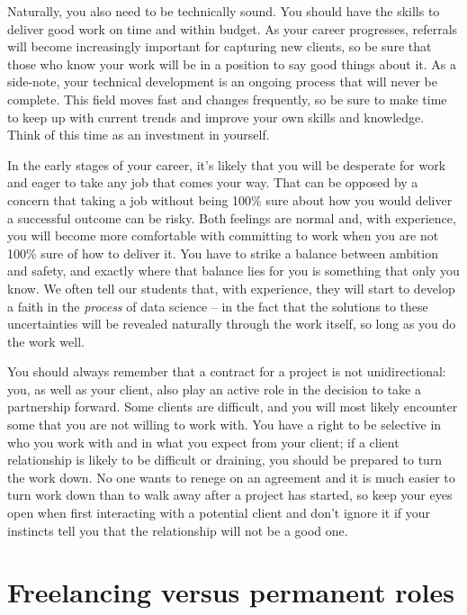 \documentclass[
]{book}
\begin{document}
Naturally, you also need to be technically sound. You should have the skills to deliver good work on time and within budget. As your career progresses, referrals will become increasingly important for capturing new clients, so be sure that those who know your work will be in a position to say good things about it. As a side-note, your technical development is an ongoing process that will never be complete. This field moves fast and changes frequently, so be sure to make time to keep up with current trends and improve your own skills and knowledge. Think of this time as an investment in yourself.

In the early stages of your career, it's likely that you will be desperate for work and eager to take any job that comes your way. That can be opposed by a concern that taking a job without being 100\% sure about how you would deliver a successful outcome can be risky. Both feelings are normal and, with experience, you will become more comfortable with committing to work when you are not 100\% sure of how to deliver it. You have to strike a balance between ambition and safety, and exactly where that balance lies for you is something that only you know. We often tell our students that, with experience, they will start to develop a faith in the \emph{process} of data science -- in the fact that the solutions to these uncertainties will be revealed naturally through the work itself, so long as you do the work well.

You should always remember that a contract for a project is not unidirectional: you, as well as your client, also play an active role in the decision to take a partnership forward. Some clients are difficult, and you will most likely encounter some that you are not willing to work with. You have a right to be selective in who you work with and in what you expect from your client; if a client relationship is likely to be difficult or draining, you should be prepared to turn the work down. No one wants to renege on an agreement and it is much easier to turn work down than to walk away after a project has started, so keep your eyes open when first interacting with a potential client and don't ignore it if your instincts tell you that the relationship will not be a good one.

\hypertarget{freelancing-versus-permanent-roles}{%
\section{Freelancing versus permanent roles}\label{freelancing-versus-permanent-roles}}
\end{document}
